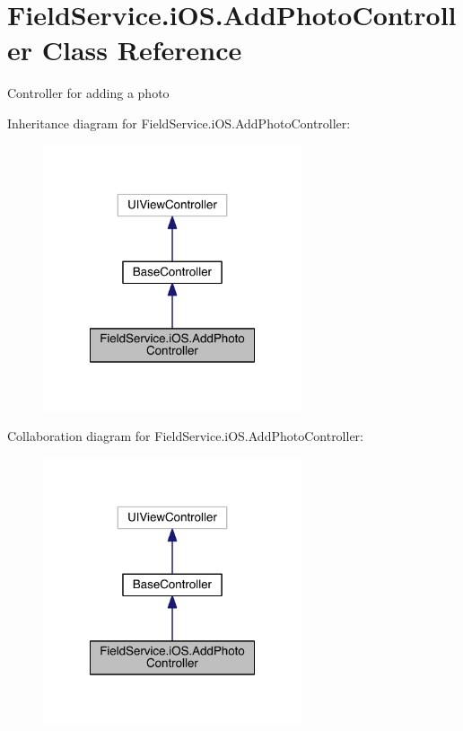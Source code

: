 \hypertarget{class_field_service_1_1i_o_s_1_1_add_photo_controller}{\section{Field\+Service.\+i\+O\+S.\+Add\+Photo\+Controller Class Reference}
\label{class_field_service_1_1i_o_s_1_1_add_photo_controller}
}


Controller for adding a photo  




Inheritance diagram for Field\+Service.\+i\+O\+S.\+Add\+Photo\+Controller\+:
\nopagebreak
\begin{figure}[H]
\begin{center}
\leavevmode
\includegraphics[width=216pt]{class_field_service_1_1i_o_s_1_1_add_photo_controller__inherit__graph}
\end{center}
\end{figure}


Collaboration diagram for Field\+Service.\+i\+O\+S.\+Add\+Photo\+Controller\+:
\nopagebreak
\begin{figure}[H]
\begin{center}
\leavevmode
\includegraphics[width=216pt]{class_field_service_1_1i_o_s_1_1_add_photo_controller__coll__graph}
\end{center}
\end{figure}

